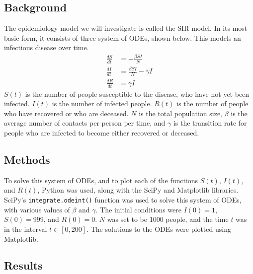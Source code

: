 \documentclass{article}
\begin{document}
\subsection{Background}
The epidemiology model we will investigate is called the SIR model. In its most basic form, it consists of three system of ODEs, shown below. This models an infectious disease over time.
\begin{align}
    \frac{dS}{dt} &= -\frac{\beta S I}{N}\\
    \frac{dI}{dt} &= \frac{\beta S I}{N} - \gamma I\\
    \frac{dR}{dt} &= \gamma I
\end{align}
$S(t)$ is the number of people susceptible to the disease, who have not yet been infected. $I(t)$ is the number of infected people. $R(t)$ is the number of people who have recovered or who are deceased. $N$ is the total population size, $\beta$ is the average number of contacts per person per time, and $\gamma$ is the transition rate for people who are infected to become either recovered or deceased.

\subsection{Methods}
To solve this system of ODEs, and to plot each of the functions $S(t)$, $I(t)$, and $R(t)$, Python was used, along with the SciPy and Matplotlib libraries. SciPy's \verb|integrate.odeint()| function was used to solve this system of ODEs, with various values of $\beta$ and $\gamma$. The initial conditions were $I(0) = 1$, $S(0)=999$, and $R(0) = 0$. $N$ was set to be 1000 people, and the time $t$ was in the interval $t \in [0,200]$. The solutions to the ODEs were plotted using Matplotlib.

\subsection{Results}
\end{document}

